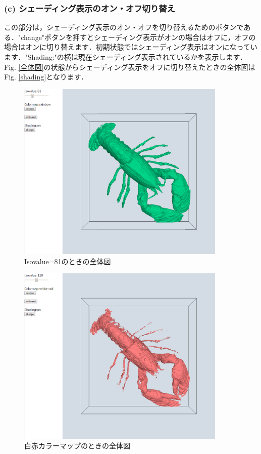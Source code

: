 ﻿\documentclass[a4paper,10pt,fleqn]{jarticle}
\begin{document}
\subsubsection*{(c) シェーディング表示のオン・オフ切り替え}
この部分は，シェーディング表示のオン・オフを切り替えるためのボタンである．"change"ボタンを押すとシェーディング表示がオンの場合はオフに，オフの場合はオンに切り替えます．初期状態ではシェーディング表示はオンになっています．"Shading:"の横は現在シェーディング表示されているかを表示します．Fig. \ref{全体図}の状態からシェーディング表示をオフに切り替えたときの全体図はFig. \ref{shading}となります．
\begin{figure}[H]
\renewcommand{\figurename}{Fig.}
\begin{center}
\includegraphics[width=10cm,bb=0 0 1041 899]{Isovalue.png}
\caption{Isovalue=81のときの全体図}
\label{isovalue}
\end{center}
\end{figure}
\begin{figure}[H]
\renewcommand{\figurename}{Fig.}
\begin{center}
\includegraphics[width=10cm,bb=0 0 1041 899]{white-red.png}
\caption{白赤カラーマップのときの全体図}
\label{white-red}
\end{center}
\end{figure}
\end{document}

